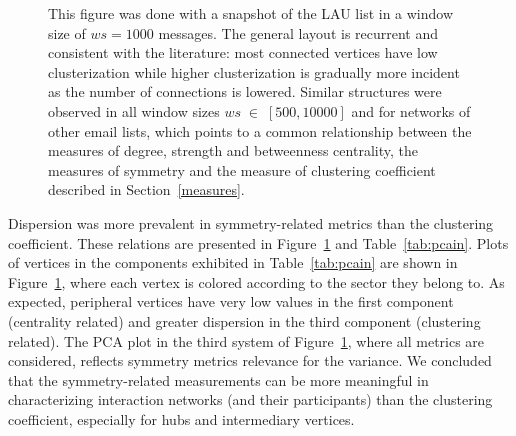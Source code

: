 \documentclass[%
 aip,
 jmp,%
 amsmath,amssymb,
 reprint,%
]{revtex4-1}
\begin{document}
\begin{figure}
{		This figure was done with a snapshot of the LAU list in a window size of $ws = 1000$ messages.
		The general layout is recurrent and consistent with the literature: most connected vertices have low clusterization while higher clusterization is gradually more incident as the number of connections is lowered.
		Similar structures were observed in all window sizes $ws\;\in\;[500,10000]$ and for networks of other email lists, which points to a common relationship between the measures of degree, strength and betweenness centrality, the measures of symmetry and the measure of clustering coefficient described in Section~\ref{measures}.
    }
    \label{fig:sym}
\end{figure}


Dispersion was more prevalent in symmetry-related metrics than the clustering coefficient. These relations are presented in Figure~\ref{fig:sym} and Table~\ref{tab:pcain}.
Plots of vertices in the components exhibited in Table~\ref{tab:pcain} are shown in Figure~\ref{fig:sym}, where each vertex is colored according to the sector they belong to. As expected, peripheral vertices have very low values in the first component (centrality related) and greater dispersion in the third component (clustering related).
The PCA plot in the third system of Figure~\ref{fig:sym}, where all metrics are considered, reflects symmetry metrics relevance for the variance.
We concluded that the symmetry-related measurements can be more meaningful in characterizing interaction networks (and their participants) than the clustering coefficient, especially for hubs and intermediary vertices.


\end{document}
